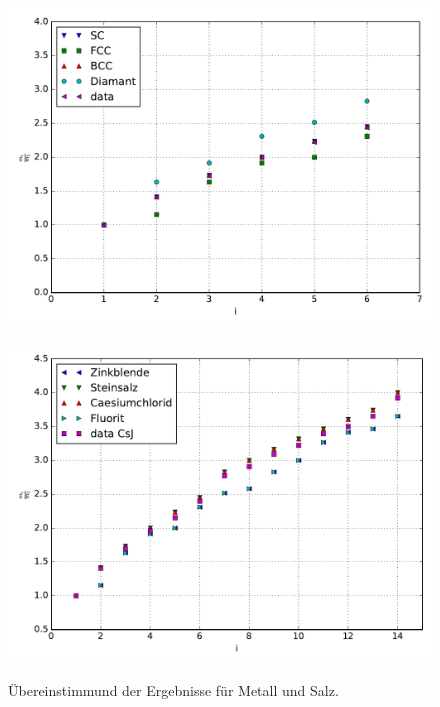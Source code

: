\begin{figure}[h]
	\begin{minipage}[t]{0.45\textwidth}
		\includegraphics[width=\textwidth]{Abbildungen/verhaeltnisse.pdf}
		\label{fig:verhaeltnisse_metall}
	\end{minipage}
	\begin{minipage}[t]{0.45\textwidth}
		\includegraphics[width=\textwidth]{Abbildungen/verhaeltnisse_Salz.pdf}
		\label{fig:verhaeltnisse_salz}
\end{minipage}
\caption{Übereinstimmund der Ergebnisse für Metall und Salz.}
\label{fig:verhaeltnisse}
\end{figure}

